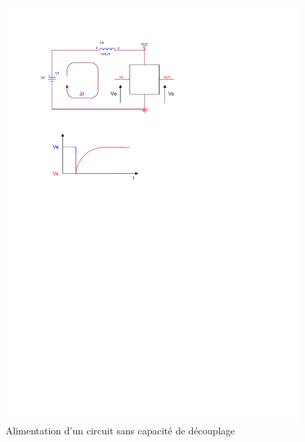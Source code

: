 \documentclass[a4paper]{article}
\begin{document}
\begin{figure}[H]
	\centering
	\includegraphics[scale=1.00]{Images/Alimentation_circuit_sans_capa_decouplage}
	\caption{Alimentation d'un circuit sans capacité de découplage
		\label{Alimentation_circuit_sans_capa_decouplage}}
\end{figure}
\end{document}

